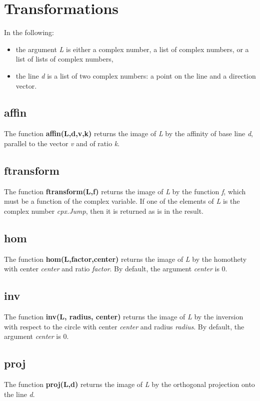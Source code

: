\section{Transformations}
In the following:
\begin{itemize}
    \item the argument \emph{L} is either a complex number, a list of complex numbers, or a list of lists of complex numbers,
    \item the line \emph{d} is a list of two complex numbers: a point on the line and a direction vector.
\end{itemize}

\subsection{affin}
The function \textbf{affin(L,d,v,k)} returns the image of \emph{L} by the affinity of base line \emph{d}, parallel to the vector \emph{v} and of ratio \emph{k}.

\subsection{ftransform}
The function \textbf{ftransform(L,f)} returns the image of \emph{L} by the function \emph{f}, which must be a function of the complex variable. If one of the elements of \emph{L} is the complex number \emph{cpx.Jump}, then it is returned as is in the result.

\subsection{hom}
The function \textbf{hom(L,factor,center)} returns the image of \emph{L} by the homothety with center \emph{center} and ratio \emph{factor}. By default, the argument \emph{center} is 0.

\subsection{inv}
The function \textbf{inv(L, radius, center)} returns the image of \emph{L} by the inversion with respect to the circle with center \emph{center} and radius \emph{radius}. By default, the argument \emph{center} is 0.

\subsection{proj}
The function \textbf{proj(L,d)} returns the image of \emph{L} by the orthogonal projection onto the line \emph{d}.

